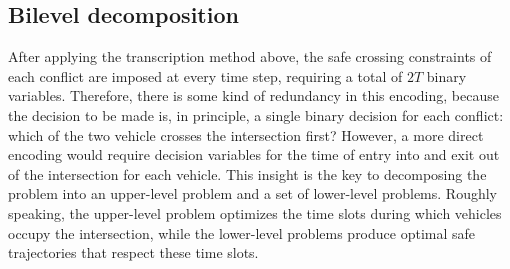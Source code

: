 \documentclass[a4paper]{report}
\theoremstyle{definition}
\theoremstyle{plain}
\begin{document}
\subsection{Bilevel decomposition}\label{sec:bilevel}

After applying the transcription method above, the safe crossing constraints of
each conflict are imposed at every time step, requiring a total of $2T$ binary
variables.
%
Therefore, there is some kind of redundancy in this encoding, because the
decision to be made is, in principle, a single binary decision for each
conflict: which of the two vehicle crosses the intersection first?
%
However, a more direct encoding would require decision variables for the time of
entry into and exit out of the intersection for each vehicle.
%
This insight is the key to decomposing the problem into an upper-level problem
and a set of lower-level problems.
%
Roughly speaking, the upper-level problem optimizes the time slots during which
vehicles occupy the intersection, while the lower-level problems produce optimal
safe trajectories that respect these time slots.
%
%
\end{document}
